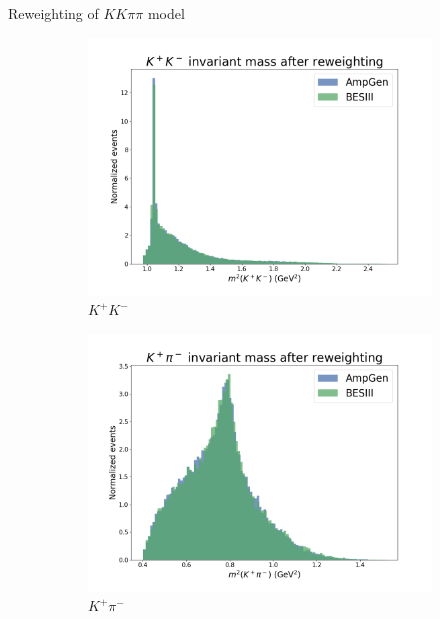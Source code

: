 \documentclass{beamer}
\begin{document}
\begin{frame}{Reweighting of \texorpdfstring{$KK\pi\pi$}{KKpipi} model}
  \begin{figure}
    \centering
    \begin{subfigure}{0.33\textwidth}
      \centering
      \includegraphics[width=\textwidth]{Plots/s01_AfterReweighting.png}
      \caption{$K^+K^-$}
    \end{subfigure}%
    \begin{subfigure}{0.33\textwidth}
      \centering
      \includegraphics[width=\textwidth]{Plots/s03_AfterReweighting.png}
      \caption{$K^+\pi^-$}
    \end{subfigure}%
    \begin{subfigure}{0.33\textwidth}

\end{subfigure}
\end{figure}
\end{frame}
\end{document}
